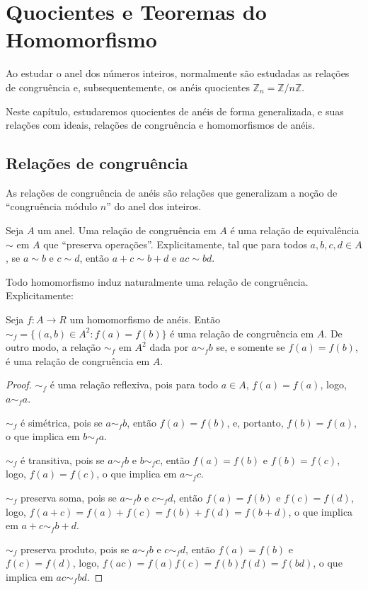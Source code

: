 \chapter{Quocientes e Teoremas do Homomorfismo}

Ao estudar o anel dos números inteiros, normalmente são estudadas as relações de congruência e, subsequentemente, os anéis quocientes $\mathbb Z_n=\mathbb Z/n\mathbb Z$.

Neste capítulo, estudaremos quocientes de anéis de forma generalizada, e suas relações com ideais, relações de congruência e homomorfismos de anéis.

\section{Relações de congruência}
As relações de congruência de anéis são relações que generalizam a noção de ``congruência módulo $n$'' do anel dos inteiros.

\begin{definition}
    Seja $A$ um anel. Uma relação de congruência em $A$ é uma relação de equivalência $\sim$ em $A$ que ``preserva operações''.
    Explicitamente, tal que para todos $a, b, c, d \in A$, se $a\sim b$ e $c\sim d$, então $a+c\sim b+d$ e $ac\sim bd$.
\end{definition}

Todo homomorfismo induz naturalmente uma relação de congruência.
Explicitamente:

\begin{prop}
Seja $f: A\rightarrow R$ um homomorfismo de anéis.
Então $\sim_f=\{(a, b) \in A^2: f(a)=f(b)\}$ é uma relação de congruência em $A$.
De outro modo, a relação $\sim_f$ em $A^2$ dada por $a \sim_f b$ se, e somente se $f(a)=f(b)$, é uma relação de congruência em $A$.
\end{prop}

\begin{proof}
    $\sim_f$ é uma relação reflexiva, pois para todo $a \in A$, $f(a)=f(a)$, logo, $a\sim_f a$.

    $\sim_f$ é simétrica, pois se $a\sim_f b$, então $f(a)=f(b)$, e, portanto, $f(b)=f(a)$, o que implica em $b\sim_f a$.

    $\sim_f$ é transitiva, pois se $a\sim_f b$ e $b\sim_f c$, então $f(a)=f(b)$ e $f(b)=f(c)$, logo, $f(a)=f(c)$, o que implica em $a\sim_f c$.

    $\sim_f$ preserva soma, pois se $a\sim_f b$ e $c\sim_f d$, então $f(a)=f(b)$ e $f(c)=f(d)$, logo, $f(a+c)=f(a)+f(c)=f(b)+f(d)=f(b+d)$, o que implica em $a+c\sim_f b+d$.

    $\sim_f$ preserva produto, pois se $a\sim_f b$ e $c\sim_f d$, então $f(a)=f(b)$ e $f(c)=f(d)$, logo, $f(ac)=f(a)f(c)=f(b)f(d)=f(bd)$, o que implica em $ac\sim_f bd$.
\end{proof}


